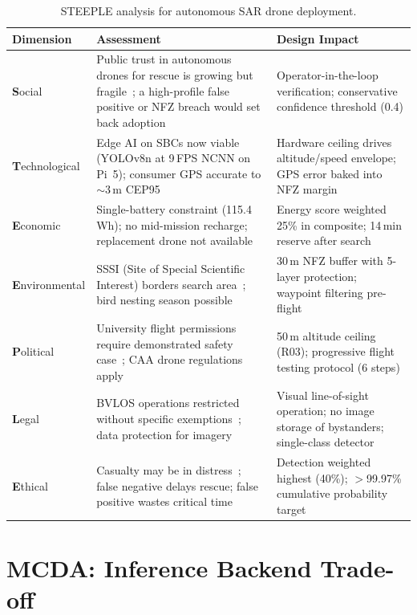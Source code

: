 \documentclass[10pt,a4paper]{article}
\newcommand{\compactTable}{\small\setlength{\tabcolsep}{3pt}\renewcommand{\arraystretch}{1.05}}
\begin{document}
\begin{table}[H]
  \centering\compactTable
  \caption{STEEPLE analysis for autonomous SAR drone deployment.}\label{tab:steeple}
  \begin{tabularx}{\linewidth}{@{}l X l@{}}
    \toprule
    \textbf{Dimension} & \textbf{Assessment} & \textbf{Design Impact} \\
    \midrule
    \textbf{S}ocial & Public trust in autonomous drones for rescue is growing but fragile~\citep{goodrich2007human}; a high-profile false positive or NFZ breach would set back adoption & Operator-in-the-loop verification; conservative confidence threshold (0.4) \\
    \textbf{T}echnological & Edge AI on SBCs now viable~\citep{edgeai} (YOLOv8n at 9\,FPS NCNN on Pi~5); consumer GPS accurate to $\sim$3\,m CEP95~\citep{misra2006global} & Hardware ceiling drives altitude/speed envelope; GPS error baked into NFZ margin \\
    \textbf{E}conomic & Single-battery constraint (115.4\,Wh); no mid-mission recharge; replacement drone not available & Energy score weighted 25\% in composite; 14\,min reserve after search \\
    \textbf{E}nvironmental & SSSI (Site of Special Scientific Interest) borders search area~\citep{wca1981}; bird nesting season possible & 30\,m NFZ buffer with 5-layer protection; waypoint filtering pre-flight \\
    \textbf{P}olitical & University flight permissions require demonstrated safety case~\cite{jarus2019sora}; CAA drone regulations apply & 50\,m altitude ceiling (R03); progressive flight testing protocol (6 steps) \\
    \textbf{L}egal & BVLOS operations restricted without specific exemptions~\citep{caa2024uas}; data protection for imagery & Visual line-of-sight operation; no image storage of bystanders; single-class detector \\
    \textbf{E}thical & Casualty may be in distress~\citep{golden2006hypothermia}; false negative delays rescue; false positive wastes critical time & Detection weighted highest (40\%); $>$99.97\% cumulative probability target \\
    \bottomrule
  \end{tabularx}
\end{table}

\section{MCDA: Inference Backend Trade-off}\label{sec:mcda}
\end{document}
